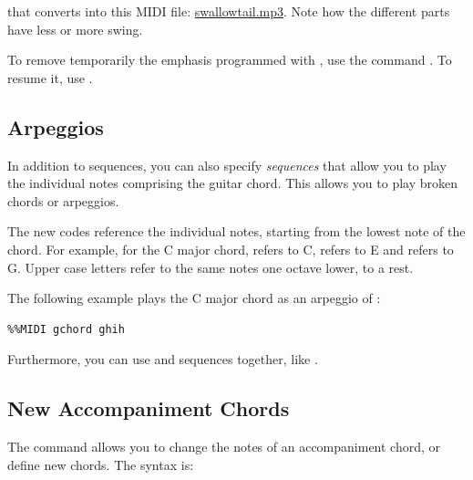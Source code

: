 \documentclass[a4paper,fullpage,12pt]{book}
\begin{document}
that converts into this MIDI file:
\href{run:swallowtail.mp3}{swallowtail.mp3}. Note how the different parts
have less or more swing.

To remove temporarily the emphasis programmed with , use the command . To resume it,
use .



\subsection{Arpeggios}
\label{sec:arpeggios}

In addition to  sequences, you can also specify
\emph{ sequences} that allow you to play the individual
notes comprising the guitar chord. This allows you to play broken
chords or arpeggios.

The new codes  reference the individual notes, starting
from the lowest note of the chord. For example, for the C major chord,
 refers to C,  refers to E and  refers to G.
Upper case letters refer to the same notes one octave lower, 
to a rest.

The following example plays the C major chord as an arpeggio of
:

\begin{verbatim}
%%MIDI gchord ghih
\end{verbatim}

Furthermore, you can use  and  sequences together,
like .




\subsection{New Accompaniment Chords}
\label{sec:newacc}

The  command allows you to change the notes of
an accompaniment chord, or define new chords. The syntax is:

\medskip

    
  
\end{document}
